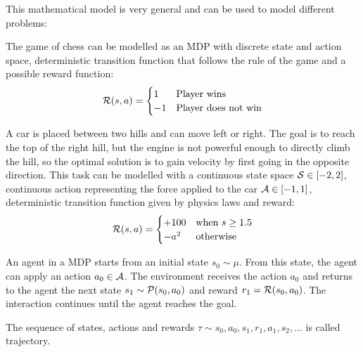 This mathematical model is very general and can be used to model different problems:

\begin{example}[Chess]
The game of chess can be modelled as an MDP with discrete state and action space, deterministic transition function that follows the rule of the game and a possible reward function:
\begin{equation*}
\mathcal{R}(s,a) = \begin{cases}1 & \textrm{Player wins} \\ -1 & \textrm{Player does not win} \end{cases}
\end{equation*}
\end{example}

\begin{example}
A car is placed between two hills and can move left or right. The goal is to reach the top of the right hill, but the engine is not powerful enough to directly climb the hill, so the optimal solution is to gain velocity by first going in the opposite direction. This task can be modelled with a continuous state space $\mathcal{S} \in [-2, 2]$, continuous action representing the force applied to the car $\mathcal{A} \in [-1, 1]$, deterministic transition function given by physics laws and reward:
\begin{equation*}
\mathcal{R}(s,a) = \begin{cases} +100 & \textrm{when } s \geq 1.5 \\ -a^2 & \textrm{otherwise} \end{cases}
\end{equation*}
\end{example}


\begin{example}[Cartpole]

\end{example}


An agent in a MDP starts from an initial state $s_0 \sim \mu$. From this state, the agent can apply an action $a_0 \in \mathcal{A}$. The environment receives the action $a_0$ and returns to the agent the next state $s_1 \sim \mathcal{P}(s_0, a_0)$ and reward $r_1 = \mathcal{R}(s_0, a_0)$. The interaction continues until the agent reaches the goal.

The sequence of states, actions and rewards $\tau \sim s_0, a_0, s_1, r_1, a_1, s_2, \ldots$ is called trajectory.


